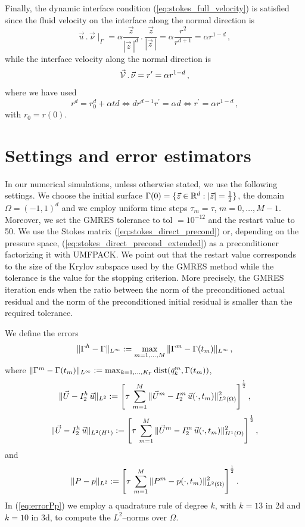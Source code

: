 Finally, the dynamic interface condition (\ref{eq:stokes_full_velocity}) is
satisfied since the fluid velocity on the interface along the normal direction
is
\begin{equation*}
\vec u\,.\,\vec \nu \!\mid_\Gamma=\alpha\frac{\vec z}{|\vec z \,|^d}\,.\,
\frac{\vec z}{|\vec z \,|}=\alpha\frac{r^2}{r^{d+1}}=\alpha r^{1-d}\,,
\end{equation*}
while the interface velocity along the normal direction is
\begin{equation*}
\vec{\mathcal{V}}\,.\,\vec \nu=r^\prime=\alpha r^{1-d}\,,
\end{equation*}
where we have used
\begin{equation*}
r^d=r_0^d+\alpha t d \iff d r^{d-1}r^\prime=\alpha d \iff r^\prime=\alpha
r^{1-d}\,,
\end{equation*}
with $r_0=r(0)$.

\section{Settings and error estimators}\label{sec:errors}
In our numerical simulations, unless otherwise stated, we use the following
settings. We choose the initial surface $\Gamma(0) = \{ \vec z \in \mathbb R^d : |\vec
z| = \frac12 \}$, the domain $\Omega = (-1,1)^d$ and we employ uniform time
steps $\tau_m=\tau$, $m=0,\ldots, M-1$. Moreover, we set the GMRES tolerance to
tol $=10^{-12}$ and the restart value to 50. We use the Stokes matrix
(\ref{eq:stokes_direct_precond}) or, depending on the pressure space,
(\ref{eq:stokes_direct_precond_extended}) as a preconditioner factorizing it
with UMFPACK. We point out that the restart value corresponds to the size
of the Krylov subspace used by the GMRES method while the tolerance is the
value for the stopping criterion. More precisely, the GMRES iteration ends when
the ratio between the norm of the preconditioned actual residual and the norm
of the preconditioned initial residual is smaller than the required tolerance.

We define the errors
\begin{equation} \label{eq:errorXx}
\|\Gamma^h - \Gamma\|_{L^\infty} := \max_{m=1,\ldots, M} \|\Gamma^m - \Gamma(t_m)\|_{L^\infty}\,,
\end{equation}
where $\|\Gamma^m - \Gamma(t_m)\|_{L^\infty} :=
\max_{k=1,\ldots, K_\Gamma} {\rm dist}( \vec q^m_k, \Gamma(t_m))$,
\begin{equation} \label{eq:errorLUu}
\|\vec U - I^h_{2}\,\vec u\|_{L^2} := \left[\tau\,\sum_{m=1}^M \|\vec U^m - I^m_2\,\vec u(\cdot,
t_m)\|_{L^2(\Omega)}^2 \right]^\frac12,
\end{equation}
\begin{equation} \label{eq:errorHUu}
\|\vec U - I^h_{2}\,\vec u\|_{L^2(H^1)} := \left[\tau\,\sum_{m=1}^M \|\vec U^m - I^m_2\,\vec u(\cdot,
t_m)\|_{H^1(\Omega)}^2 \right]^\frac12,
\end{equation}
and
\begin{equation} \label{eq:errorPp}
\|P - p\|_{L^2} := \left[\tau\,\sum_{m=1}^M \|P^m - p(\cdot,t_m)\|_{L^2(\Omega)}^2
\right]^\frac12.
\end{equation}
In (\ref{eq:errorPp}) we employ a quadrature rule of degree $k$, with $k=13$ in
2d and $k=10$ in 3d, to compute the $L^2$--norms over $\Omega$.

